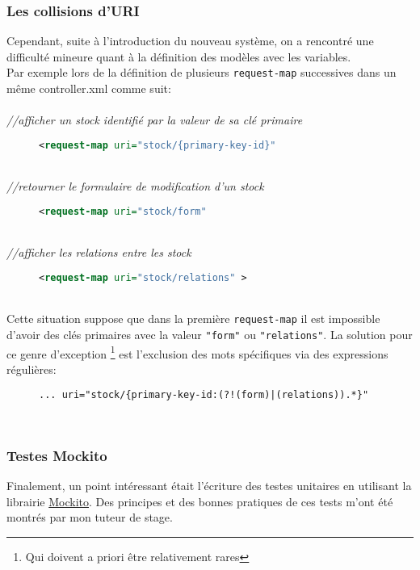\subsubsection{Les collisions d'URI}
Cependant, suite à l'introduction du nouveau système, on a rencontré une difficulté mineure quant à la définition des modèles avec les variables.\\
Par exemple lors de la définition de plusieurs \verb|request-map| successives dans un même controller.xml comme suit: \\
\\
\emph{//afficher un stock identifié par la valeur de sa clé primaire}
\begin{figure}[h!]
	\begin{lstlisting}[frame=leftline,language=xml]
<request-map uri="stock/{primary-key-id}" 
\end{lstlisting}
\end{figure}\\   
\emph{//retourner le formulaire de modification d'un stock}
\begin{figure}[h!]
	\begin{lstlisting}[frame=leftline,language=xml]
<request-map uri="stock/form" 
	\end{lstlisting}
\end{figure}\\
\emph{//afficher les relations entre les stock}
\begin{figure}[h!]
	\begin{lstlisting}[frame=leftline,language=xml]
<request-map uri="stock/relations" >
	\end{lstlisting}
\end{figure}  \\
Cette situation suppose que dans la première \verb|request-map| il est impossible d'avoir des clés primaires avec la valeur \verb|"form"| ou \verb|"relations"|. La solution pour ce genre d'exception \footnote{Qui doivent a priori être relativement rares} est l'exclusion des mots spécifiques via des expressions régulières: 
 \begin{figure}[h!]
 	\begin{lstlisting}[frame=leftline,language=xml,frameround=tttt]
... uri="stock/{primary-key-id:(?!(form)|(relations)).*}" 
 	\end{lstlisting}
 \end{figure}  \\


\subsubsection{Testes Mockito}
Finalement, un point intéressant était l'écriture des testes unitaires en utilisant la librairie \href{https://site.mockito.org/}{Mockito}. Des principes et des bonnes pratiques de ces tests m'ont été montrés par mon tuteur de stage. 
